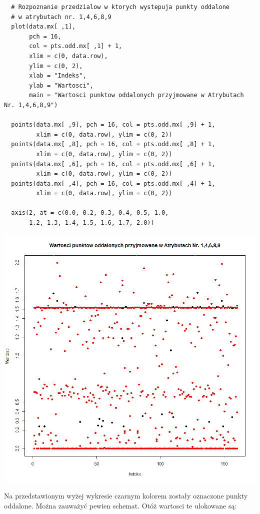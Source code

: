 \documentclass[a4paper,12pt,twoside]{article}
\begin{document}
\medskip
\begin{lstlisting}
  # Rozpoznanie przedzialow w ktorych wystepuja punkty oddalone
  # w atrybutach nr. 1,4,6,8,9
  plot(data.mx[ ,1],
       pch = 16,
       col = pts.odd.mx[ ,1] + 1,
       xlim = c(0, data.row),
       ylim = c(0, 2),
       xlab = "Indeks",
       ylab = "Wartosci",
       main = "Wartosci punktow oddalonych przyjmowane w Atrybutach Nr. 1,4,6,8,9")

  points(data.mx[ ,9], pch = 16, col = pts.odd.mx[ ,9] + 1,
         xlim = c(0, data.row), ylim = c(0, 2))
  points(data.mx[ ,8], pch = 16, col = pts.odd.mx[ ,8] + 1,
         xlim = c(0, data.row), ylim = c(0, 2))
  points(data.mx[ ,6], pch = 16, col = pts.odd.mx[ ,6] + 1,
         xlim = c(0, data.row), ylim = c(0, 2))
  points(data.mx[ ,4], pch = 16, col = pts.odd.mx[ ,4] + 1,
         xlim = c(0, data.row), ylim = c(0, 2))

  axis(2, at = c(0.0, 0.2, 0.3, 0.4, 0.5, 1.0,
       1.2, 1.3, 1.4, 1.5, 1.6, 1.7, 2.0))
\end{lstlisting}

\begin{center}
\includegraphics[width=.90\textwidth]{img/3_pkt_oddalone_14689.png}
\end{center}

Na przedstawionym wyżej wykresie czarnym kolorem zostały oznaczone punkty oddalone. Można zauważyć
pewien schemat. Otóż wartosci te ulokowane są:
\end{document}
